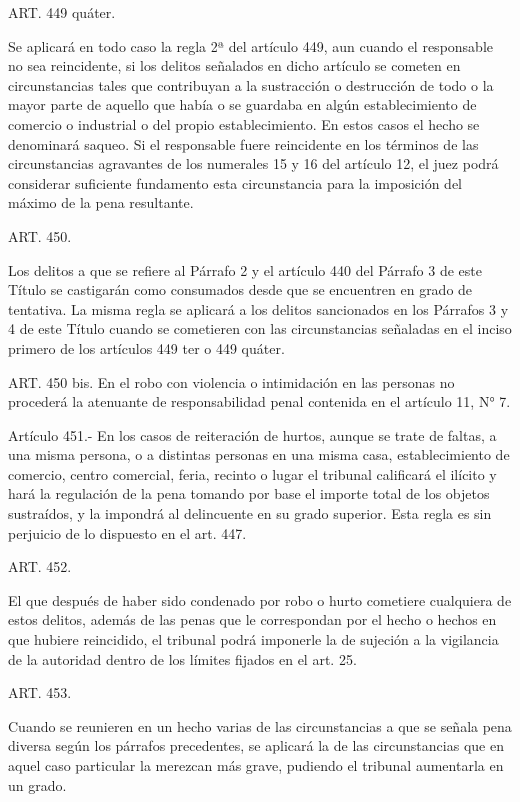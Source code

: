     ART. 449 quáter.

    Se aplicará en todo caso la regla 2ª del artículo 449, aun cuando el responsable no sea reincidente, si los delitos señalados en dicho artículo se cometen en circunstancias tales que contribuyan a la sustracción o destrucción de todo o la mayor parte de aquello que había o se guardaba en algún establecimiento de comercio o industrial o del propio establecimiento. En estos casos el hecho se denominará saqueo.
    Si el responsable fuere reincidente en los términos de las circunstancias agravantes de los numerales 15 y 16 del artículo 12, el juez podrá considerar suficiente fundamento esta circunstancia para la imposición del máximo de la pena resultante. 



    ART. 450.

    Los delitos a que se refiere al Párrafo 2 y el artículo 440 del Párrafo 3 de este Título se castigarán como consumados desde que se encuentren en grado de tentativa.
    La misma regla se aplicará a los delitos sancionados en los Párrafos 3 y 4 de este Título cuando se cometieren con las circunstancias señaladas en el inciso primero de los artículos 449 ter o 449 quáter.
   



    ART. 450 bis.
    En el robo con violencia o intimidación en las personas no procederá la atenuante de responsabilidad penal contenida en el artículo 11, N° 7.

    Artículo 451.- En los casos de reiteración de hurtos, aunque se trate de faltas, a una misma persona, o a distintas personas en una misma casa, establecimiento de comercio, centro comercial, feria, recinto o lugar el tribunal calificará el ilícito y hará la regulación de la pena tomando por base el importe total de los objetos sustraídos, y la impondrá al delincuente en su grado superior.
    Esta regla es sin perjuicio de lo dispuesto en el art. 447.


    ART. 452.

    El que después de haber sido condenado por robo o hurto cometiere cualquiera de estos delitos, además de las penas que le correspondan por el hecho o hechos en que hubiere reincidido, el tribunal podrá imponerle la de sujeción a la vigilancia de la autoridad dentro de los límites fijados en el art. 25.



    ART. 453.

    Cuando se reunieren en un hecho varias de las circunstancias a que se señala pena diversa según los párrafos precedentes, se aplicará la de las circunstancias que en aquel caso particular la merezcan más grave, pudiendo el tribunal aumentarla en un grado.


